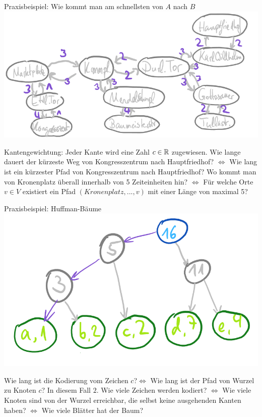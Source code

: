 \documentclass[handout]{beamer}
\begin{document}
\begin{frame}{Praxisbeispiel: Wie kommt man am schnellsten von $A$ nach $B$}
	\ip\includegraphics[scale=0.4]{images/graph_beispiel_kvv.png}
	\begin{itemize}
		\pitem Kantengewichtung: Jeder Kante wird eine Zahl $c \in \mathbb{R}$ zugewiesen.
		\pitem Wie lange dauert der kürzeste Weg von Kongresszentrum nach Hauptfriedhof? \pause $\Leftrightarrow$ Wie lang ist ein kürzester Pfad von Kongresszentrum nach Hauptfriedhof?
		\pitem Wo kommt man von Kronenplatz überall innerhalb von 5 Zeiteinheiten hin? \pause $\Leftrightarrow$ Für welche Orte $v \in V$ existiert ein Pfad $(Kronenplatz, ..., v)$ mit einer Länge von maximal 5?
	\end{itemize}
\end{frame}

\begin{frame}{Praxisbeispiel: Huffman-Bäume}
	\ip\includegraphics[scale=0.4]{images/graph_beispiel_huffman.png}
	\begin{itemize}
		\pitem Wie lang ist die Kodierung vom Zeichen $c$?\pause $\Leftrightarrow$ Wie lang ist der Pfad von Wurzel zu Knoten $c$? In diesem Fall $2$.
		\pitem Wie viele Zeichen werden kodiert? \pause $\Leftrightarrow$ Wie viele Knoten sind von der Wurzel erreichbar, die selbst keine ausgehenden Kanten haben? \pause $\Leftrightarrow$ Wie viele Blätter hat der Baum?
	\end{itemize}
\end{frame}
\end{document}
